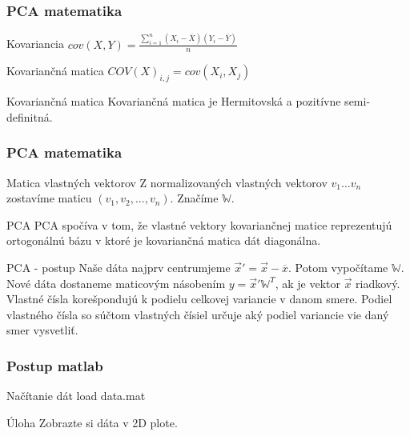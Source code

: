 \documentclass{beamer}
\begin{document}
\begin{frame}
\frametitle{PCA matematika}

\begin{block}{Kovariancia}
$cov (X, Y) = \frac{\sum_{i=1}^n (X_i - \overline{X})(Y_i - \overline{Y})}{n}$
\end{block}

\begin{block}{Kovariančná matica}
$COV(X)_{i,j} = cov(X_i, X_j)$
\end{block}

\begin{block}{Kovariančná matica}
Kovariančná matica je Hermitovská a pozitívne semi-definitná.
\end{block}
\end{frame}



\begin{frame}
\frametitle{PCA matematika}

\begin{block}{Matica vlastných vektorov}
Z normalizovaných vlastných vektorov $v_1 ... v_n$ zostavíme maticu $(v_1, v_2, ... , v_n)$. Značíme $\mathbb{W}$.
\end{block}

\begin{block}{PCA}
PCA spočíva v tom, že vlastné vektory kovariančnej matice reprezentujú ortogonálnú bázu v ktoré je kovariančná matica dát diagonálna.
\end{block}

\begin{block}{PCA - postup}
Naše dáta najprv centrumjeme $\vec{x}' = \vec{x} - \overline{x}$. Potom vypočítame $\mathbb{W}$. Nové dáta dostaneme maticovým násobením $ y = \vec{x}' \mathbb{W}^T$, ak je vektor $\vec{x}$ riadkový. Vlastné čísla korešpondujú k podielu celkovej variancie v danom smere. Podiel vlastného čísla so súčtom vlastných čísiel určuje aký podiel variancie vie daný smer vysvetliť.  
\end{block}
\end{frame}



\begin{frame}
\frametitle{Postup matlab}

\begin{block}{Načítanie dát}
load data.mat
\end{block}

\begin{block}{Úloha}
Zobrazte si dáta v 2D plote.
\end{block}

\end{frame}
\end{document}
